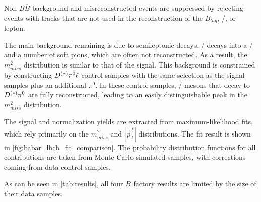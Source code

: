 Non-$B \overline{B}$ background and misreconstructed events are suppressed by
rejecting events with tracks that are not used in the reconstruction of the
$B_{tag}$, \DDst/, or lepton.

The main background remaining is due to semileptonic
\BMesonMode{\ell}{\Dstst/} decays.
\Dstst/ decays into a \Dst/ and a number of soft pions, which are often not
reconstructed.
As a result, the $m^2_{miss}$ distribution is similar to that of the signal.
This background is constrained by constructing $\DDst/ \pi^0 \ell$ control
samples with the same selection as the signal samples plus an additional
$\pi^0$.
In these control samples, \Dstst/ mesons that decay to $\DDst/ \pi^0$ are
fully reconstructed, leading to an easily distinguishable peak in the
$m^2_{miss}$ distribution.

The signal and normalization yields are extracted from maximum-likelihood fits,
which rely primarily on the $m^2_{miss}$ and $|\vec{p}^*_\ell|$ distributions.
The fit result is shown in \autoref{fig:babar_lhcb_fit_comparison}.
The probability distribution functions for all contributions are taken from
Monte-Carlo simulated samples, with corrections coming from data control
samples.

As can be seen in \autoref{tab:results}, all four $B$ factory results are
limited by the size of their data samples.

